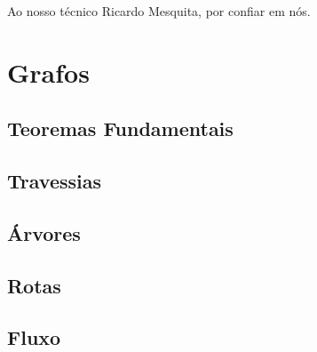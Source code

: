 




\newpage

\begin{dedication}
	Ao nosso técnico Ricardo Mesquita, por confiar em nós. 
\end{dedication}

\tableofcontents


\newpage


\newpage


\newpage


\newpage

\chapter{Grafos}
    \section{Teoremas Fundamentais}
        
    \section{Travessias}
        
        
        
        
    \section{Árvores}
        
    \section{Rotas}
        
        
        
        
    \section{Fluxo}
\newpage


\newpage


\newpage


\newpage

% 

% 

% 

